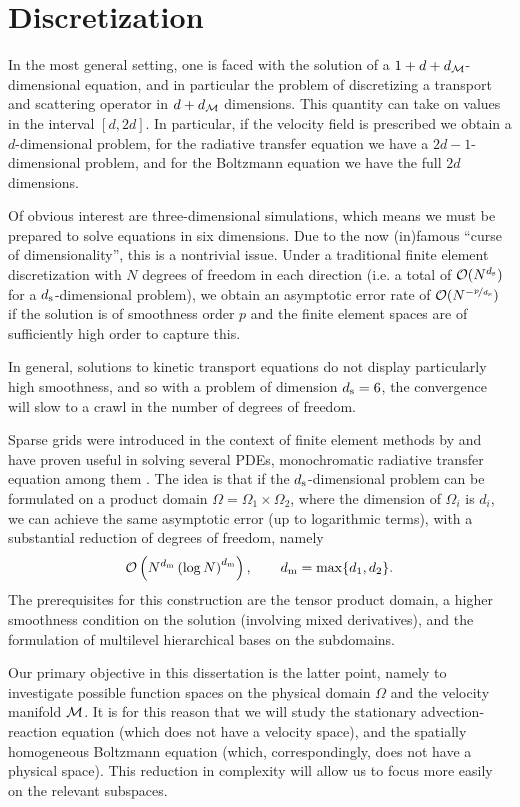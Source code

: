 \section{Discretization}

In the most general setting, one is faced with the solution of a $1+d+d_{\mathcal{M}}$-dimensional equation, and in
particular the problem of discretizing a transport and scattering operator in $d+d_{\mathcal{M}}$ dimensions. This
quantity can take on values in the interval $[d,2d]$. In particular, if the velocity field is prescribed we
obtain a $d$-dimensional problem, for the radiative transfer equation we have a $2d-1$-dimensional problem,
and for the Boltzmann equation we have the full $2d$ dimensions.

Of obvious interest are three-dimensional simulations, which means we must be prepared to solve equations in
six dimensions. Due to the now (in)famous ``curse of dimensionality'', this is a nontrivial issue.  Under a
traditional finite element discretization with $N$ degrees of freedom in each direction (i.e. a total of
$\mathcal{O}(N^{d_{\mathrm{s}}})$ for a $d_{\mathrm{s}}$-dimensional problem), we obtain an asymptotic error rate of
$\mathcal{O}(N^{-\nicefrac{p}{d_{\mathrm{s}}}})$ if the solution is of smoothness order $p$ and the finite element spaces are
of sufficiently high order to capture this.

In general, solutions to kinetic transport equations do not display particularly high smoothness, and so with
a problem of dimension $d_{\mathrm{s}}=6$, the convergence will slow to a crawl in the number of degrees of freedom.

Sparse grids were introduced in the context of finite element methods by \cite{Zenger1991pap} and have proven
useful in solving several PDEs, monochromatic radiative transfer equation among them \cite{Widmer2008saf}. The idea
is that if the $d_{\mathrm{s}}$-dimensional problem can be formulated on a product domain $\Omega = \Omega_1 \times
\Omega_2$, where the dimension of $\Omega_i$ is $d_i$, we can achieve the same asymptotic error (up to
logarithmic terms), with a substantial reduction of degrees of freedom, namely
\[
    \mathcal{O}\left(N^{d_{\mathrm{m}}} \left(\log N\right)^{d_{\mathrm{m}}} \right), \qquad d_{\mathrm{m}} = \max\{d_1,d_2\}.
\]
The prerequisites for this construction are the tensor product domain, a higher smoothness condition on the
solution (involving mixed derivatives), and the formulation of multilevel hierarchical bases on the subdomains.

Our primary objective in this dissertation is the latter point, namely to investigate possible function spaces
on the physical domain $\Omega$ and the velocity manifold $\mathcal{M}$. It is for this reason that we will study the
stationary advection-reaction equation (which does not have a velocity space), and the spatially homogeneous
Boltzmann equation (which, correspondingly, does not have a physical space). This reduction in complexity will
allow us to focus more easily on the relevant subspaces.

